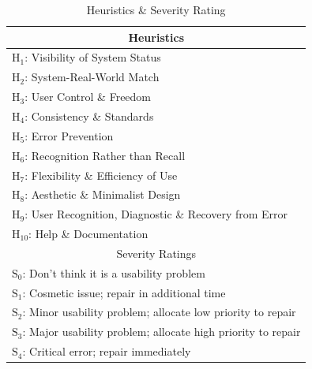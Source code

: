 \documentclass[11pt, english]{article}
\begin{document}
	\begin{table}[h]
		\scriptsize
                \renewcommand{\arraystretch}{1.25}
        \begin{center}
        \begin{tabular}{c}
                \hline
                \hline
                Heuristics\\
                \hline
                \multicolumn{1}{l}{$\mathrm{H_{1}}$: Visibility of System Status}\\
                \multicolumn{1}{l}{$\mathrm{H_{2}}$: System-Real-World Match}\\
                \multicolumn{1}{l}{$\mathrm{H_{3}}$: User Control \& Freedom}\\
                \multicolumn{1}{l}{$\mathrm{H_{4}}$: Consistency \& Standards}\\
                \multicolumn{1}{l}{$\mathrm{H_{5}}$: Error Prevention}\\
                \multicolumn{1}{l}{$\mathrm{H_{6}}$: Recognition Rather than Recall}\\
                \multicolumn{1}{l}{$\mathrm{H_{7}}$: Flexibility \& Efficiency of Use}\\
                \multicolumn{1}{l}{$\mathrm{H_{8}}$: Aesthetic \& Minimalist Design}\\
                \multicolumn{1}{l}{$\mathrm{H_{9}}$: User Recognition, Diagnostic \& Recovery from Error}\\
                \multicolumn{1}{l}{$\mathrm{H_{10}}$: Help \& Documentation}\\
                \hline
                Severity Ratings\\
                \hline
                \multicolumn{1}{l}{$\mathrm{S_{0}}$: Don't think it is a usability problem}\\
                \multicolumn{1}{l}{$\mathrm{S_{1}}$: Cosmetic issue; repair in additional time}\\
                \multicolumn{1}{l}{$\mathrm{S_{2}}$: Minor usability problem; allocate low priority to repair}\\
                \multicolumn{1}{l}{$\mathrm{S_{3}}$: Major usability problem; allocate high priority to repair}\\
                \multicolumn{1}{l}{$\mathrm{S_{4}}$: Critical error; repair immediately}\\
                \hline
                \hline
        \end{tabular}
                \caption{Heuristics \& Severity Rating}
        \end{center}
        \end{table}
\end{document}
